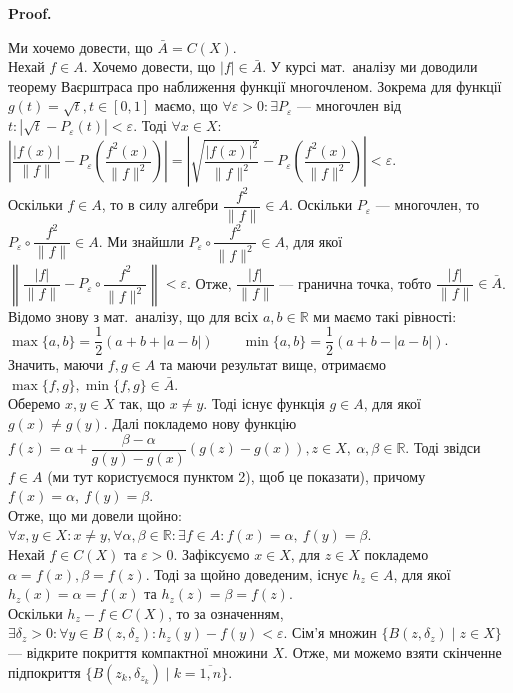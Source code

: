 \documentclass[a4paper, 10pt]{article}
\makeatletter
\theoremstyle{theoremdd}
\theoremstyle{theoremdd}
\theoremstyle{theoremdd}
\theoremstyle{theoremdd}
\theoremstyle{theoremdd}
\theoremstyle{theoremdd}
\theoremstyle{theoremdd}
\theoremstyle{theoremdd}
\renewenvironment{proof}[1][Proof.\\]{\par
\pushQED{\hfill \qed}%
\normalfont \topsep6\p@\@plus6\p@\relax
\trivlist
\item\relax
{\bfseries
#1\@addpunct{.}}\hspace\labelsep\ignorespaces
}{%
\popQED\endtrivlist\@endpefalse
}
\makeatother
\begin{document}
\begin{proof}
Ми хочемо довести, що $\bar{A} = C(X)$.\\
Нехай $f \in A$. Хочемо довести, що $|f| \in \bar{A}$. У курсі мат.\ аналізу ми доводили теорему Ваєрштраса про наближення функції многочленом. Зокрема для функції $g(t) = \sqrt{t}, t \in [0,1]$ маємо, що $\forall \varepsilon > 0: \exists P_\varepsilon$ --- многочлен від $t: |\sqrt{t} - P_\varepsilon(t)| < \varepsilon$. Тоді $\forall x \in X:$\\
$\left| \dfrac{|f(x)|}{\|f\|} - P_\varepsilon\left( \dfrac{f^2(x)}{\|f\|^2} \right) \right| = \left| \sqrt{\dfrac{|f(x)|^2}{\|f\|^2}} - P_\varepsilon\left( \dfrac{f^2(x)}{\|f\|^2} \right) \right| < \varepsilon$.\\
Оскільки $f \in A$, то в силу алгебри $\dfrac{f^2}{\|f\|} \in A$. Оскільки $P_\varepsilon$ --- многочлен, то $P_\varepsilon \circ \dfrac{f^2}{\|f\|} \in A$. Ми знайшли $P_\varepsilon \circ \dfrac{f^2}{\|f\|^2} \in A$, для якої $\left\| \dfrac{|f|}{\|f\|} - P_\varepsilon \circ \dfrac{f^2}{\|f\|^2} \right\| < \varepsilon$. Отже, $\dfrac{|f|}{\|f\|}$ --- гранична точка, тобто $\dfrac{|f|}{\|f\|} \in \bar{A}$.\\
Відомо знову з мат.\ аналізу, що для всіх $a,b \in \mathbb{R}$ ми маємо такі рівності:\\
$\max\{a,b\} = \dfrac{1}{2}\left(a+b+|a-b|\right) \qquad \min\{a,b\} = \dfrac{1}{2}\left(a+b-|a-b|\right)$.\\
Значить, маючи $f,g \in A$ та маючи результат вище, отримаємо $\max \{f,g\}, \min\{f,g\} \in \bar{A}$.\\
Оберемо $x,y \in X$ так, що $x \neq y$. Тоді існує функція $g \in A$, для якої $g(x) \neq g(y)$. Далі покладемо нову функцію $f(z) = \alpha + \dfrac{\beta-\alpha}{g(y)-g(x)}(g(z)-g(x)), z \in X,\ \alpha,\beta \in \mathbb{R}$. Тоді звідси $f \in A$ (ми тут користуємося пунктом 2), щоб це показати), причому $f(x) = \alpha,\ f(y) = \beta$.\\
Отже, що ми довели щойно: $\forall x,y \in X: x \neq y, \forall \alpha,\beta \in \mathbb{R}: \exists f \in A: f(x) = \alpha,\ f(y) = \beta$.
\bigskip \\
Нехай $f \in C(X)$ та $\varepsilon > 0$. Зафіксуємо $x \in X$, для $z \in X$ покладемо $\alpha = f(x), \beta = f(z)$. Тоді за щойно доведеним, існує $h_z \in A$, для якої $h_z(x) = \alpha = f(x)$ та $h_z(z) = \beta = f(z)$.\\
Оскільки $h_z - f \in C(X)$, то за означенням, $\exists \delta_z > 0: \forall y \in B(z,\delta_z): h_z(y)-f(y) < \varepsilon$. Сім'я множин $\{B(z,\delta_z) \mid z \in X\}$ --- відкрите покриття компактної множини $X$. Отже, ми можемо взяти скінченне підпокриття $\{B(z_k,\delta_{z_k}) \mid k = \overline{1,n}\}$.\\

\end{proof}
\end{document}
